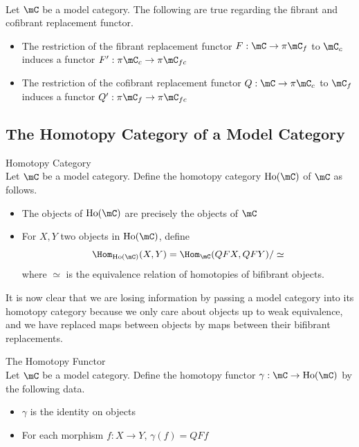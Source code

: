 \documentclass[a4paper]{article}
\begin{document}
\begin{lmm}{}{}\\ Let $\mC$ be a model category. The following are true regarding the fibrant and cofibrant replacement functor. 
\begin{itemize}
\item The restriction of the fibrant replacement functor $F:\mC\to\pi\mC_f$ to $\mC_c$ induces a functor $F':\pi\mC_c\to\pi\mC_{fc}$
\item The restriction of the cofibrant replacement functor $Q:\mC\to\pi\mC_c$ to $\mC_f$ induces a functor $Q':\pi\mC_f\to\pi\mC_{fc}$
\end{itemize}
\end{lmm}

\subsection{The Homotopy Category of a Model Category}
\begin{defn}{Homotopy Category}{}\\ Let $\mC$ be a model category. Define the homotopy category $\text{Ho}(\mC)$ of $\mC$ as follows. 
\begin{itemize}
\item The objects of $\text{Ho}(\mC)$ are precisely the objects of $\mC$
\item For $X,Y$ two objects in $\text{Ho}(\mC)$, define $$\Hom_{\text{Ho}(\mC)}(X,Y)=\Hom_\mC(QFX,QFY)/\simeq$$ where $\simeq$ is the equivalence relation of homotopies of bifibrant objects. 
\end{itemize}
\end{defn}

It is now clear that we are losing information by passing a model category into its homotopy category because we only care about objects up to weak equivalence, and we have replaced maps between objects by maps between their bifibrant replacements. 

\begin{defn}{The Homotopy Functor}{}\\ Let $\mC$ be a model category. Define the homotopy functor $\gamma:\mC\to\text{Ho}(\mC)$ by the following data. 
\begin{itemize}
\item $\gamma$ is the identity on objects
\item For each morphism $f:X\to Y$, $\gamma(f)=QFf$
\end{itemize}
\end{defn}
\end{document}
